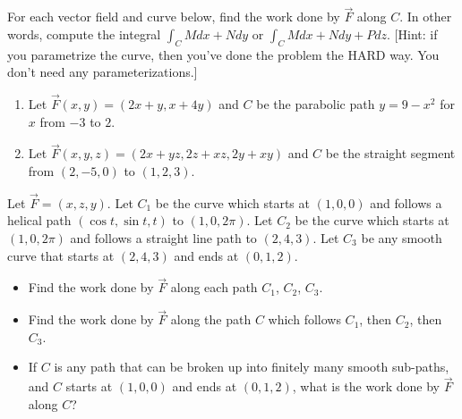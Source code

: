 \begin{problem}
%
For each vector field and curve below, find the work done by $\vec F$ along $C$. In other words, compute the integral $\int_C Mdx+Ndy$ or $\int_C Mdx+Ndy+Pdz$. [Hint: if you parametrize the curve, then you've done the problem the HARD way. You don't need any parameterizations.]
\begin{enumerate}
 \item{}%
 Let $\vec F(x,y) = (2x+y,x+4y)$ and $C$ be the parabolic path $y=9-x^2$ for $x$ from $-3$ to $2$.
 \item{}%
 Let $\vec F(x,y,z) = (2x+yz,2z+xz,2y+xy)$ and $C$ be the straight segment from $(2,-5,0)$ to $(1,2,3)$. 
\end{enumerate}
\end{problem}

\begin{problem}%
  Let $\vec F = (x,z,y)$. Let $C_1$ be the curve which starts at $(1,0,0)$ and follows a helical path $(\cos t, \sin t, t)$ to $(1,0,2\pi)$. Let $C_2$ be the curve which starts at $(1,0, 2\pi)$ and follows a straight line path to $(2,4,3)$. Let $C_3$ be any smooth curve that starts at $(2,4,3)$ and ends at $(0,1,2)$.
 \begin{itemize}
  \item Find the work done by $\vec F$ along each path $C_1$, $C_2$, $C_3$. 
  \item Find the work done by $\vec F$ along the path $C$ which follows $C_1$, then $C_2$, then $C_3$.  
  \item If $C$ is any path that can be broken up into finitely many smooth sub-paths, and $C$ starts at $(1,0,0)$ and ends at $(0,1,2)$, what is the work done by $\vec F$ along $C$?
 \end{itemize}
\end{problem}

